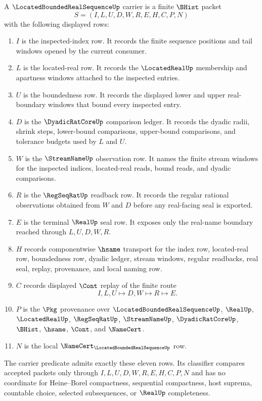 \begin{definition}
\label{def:located-bounded-real-sequence-carrier}
A $\LocatedBoundedRealSequenceUp$ carrier is a finite $\BHist$ packet
$$
S=(I,L,U,D,W,R,E,H,C,P,N)
$$
with the following displayed rows:
\begin{enumerate}
\item $I$ is the inspected-index row. It records the finite sequence positions and tail windows opened by the current consumer.
\item $L$ is the located-real row. It records the $\LocatedRealUp$ membership and apartness windows attached to the inspected entries.
\item $U$ is the boundedness row. It records the displayed lower and upper real-boundary windows that bound every inspected entry.
\item $D$ is the $\DyadicRatCoreUp$ comparison ledger. It records the dyadic radii, shrink steps, lower-bound comparisons, upper-bound comparisons, and tolerance budgets used by $L$ and $U$.
\item $W$ is the $\StreamNameUp$ observation row. It names the finite stream windows for the inspected indices, located-real reads, bound reads, and dyadic comparisons.
\item $R$ is the $\RegSeqRatUp$ readback row. It records the regular rational observations obtained from $W$ and $D$ before any real-facing seal is exported.
\item $E$ is the terminal $\RealUp$ seal row. It exposes only the real-name boundary reached through $L,U,D,W,R$.
\item $H$ records componentwise $\hsame$ transport for the index row, located-real row, boundedness row, dyadic ledger, stream windows, regular readbacks, real seal, replay, provenance, and local naming row.
\item $C$ records displayed $\Cont$ replay of the finite route
$$
I,L,U \longmapsto D,W \longmapsto R \longmapsto E .
$$
\item $P$ is the $\Pkg$ provenance over $\LocatedBoundedRealSequenceUp$, $\RealUp$, $\LocatedRealUp$, $\RegSeqRatUp$, $\StreamNameUp$, $\DyadicRatCoreUp$, $\BHist$, $\hsame$, $\Cont$, and $\NameCert$.
\item $N$ is the local $\NameCert_{\LocatedBoundedRealSequenceUp}$ row.
\end{enumerate}
The carrier predicate admits exactly these eleven rows. Its classifier compares accepted packets only through $I,L,U,D,W,R,E,H,C,P,N$ and has no coordinate for Heine--Borel compactness, sequential compactness, host suprema, countable choice, selected subsequences, or $\RealUp$ completeness.
\end{definition}

